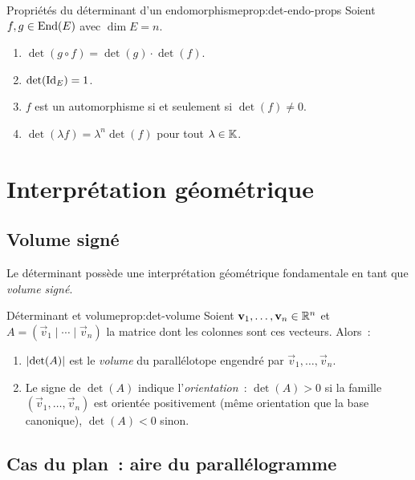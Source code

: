 \begin{proposition}{Propriétés du déterminant d'un endomorphisme}{prop:det-endo-props}
  Soient $f,g\in\operatorname{End}(E)$ avec $\dim E=n$.
  \begin{enumerate}[label=(\roman*)]
    \item $\det(g\circ f)=\det(g)\cdot\det(f)$.
    \item $\det(\operatorname{Id}_E)=1$.
    \item $f$ est un automorphisme si et seulement si $\det(f)\neq 0$.
    \item $\det(\lambda f)=\lambda^n\det(f)$ pour tout $\lambda\in{\mathbb{K}}$.
  \end{enumerate}
\end{proposition}

\section{Interprétation géométrique}\label{sec:interpretation-geometrique}

\subsection{Volume signé}\label{subsec:volume-signe}

Le déterminant possède une interprétation géométrique fondamentale en
tant que \emph{volume signé}.

\begin{proposition}{Déterminant et volume}{prop:det-volume}
  Soient $\mathbf{v}_1,\ldots,\mathbf{v}_n\in{\mathbb{R}}^n$ et
  $A=(\vec{v}_1\mid\cdots\mid\vec{v}_n)$ la matrice dont les colonnes
  sont ces vecteurs. Alors~:
  \begin{enumerate}[label=(\roman*)]
    \item $\lvert\det(A)\rvert$ est le \emph{volume} du parallélotope engendré
      par $\vec{v}_1,\ldots,\vec{v}_n$.
    \item Le signe de $\det(A)$ indique l'\emph{orientation}~:
      $\det(A)>0$ si la famille $(\vec{v}_1,\ldots,\vec{v}_n)$ est
      orientée positivement (même orientation que la base canonique),
      $\det(A)<0$ sinon.
  \end{enumerate}
\end{proposition}

\subsection{Cas du plan~: aire du parallélogramme}\label{subsec:aire-parallelogramme}

